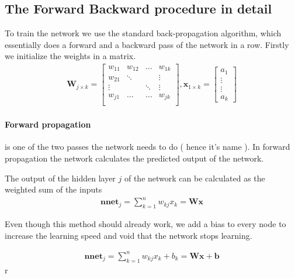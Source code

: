 \documentclass{acm_proc_article-sp}
\begin{document}
\subsection{The Forward Backward procedure in detail}

To train the network we use the standard back-propagation algorithm, which essentially does a forward and a backward pass of the network in a row.
Firstly we initialize the weights in a matrix.
\begin{align}
\mathbf{W}_{j \times k } = \begin{bmatrix}
w_{11} & w_{12} & \ldots & w_{1k}\\
w_{21} & \ddots & & \vdots\\
\vdots & & \ddots  & \vdots\\
w_{j1} & \ldots & \ldots  & w_{jk}\\
\end{bmatrix},
\mathbf{x}_{1 \times k} = \begin{bmatrix}
a_{1} \\
\vdots\\
\vdots \\
a_{k}
\end{bmatrix}
\end{align}


\paragraph{Forward propagation} is one of the two passes the network needs to do ( hence it's name ).
In forward propagation the network calculates the predicted output of the network.

The output of the hidden layer $j$ of the network can be calculated as the weighted sum of the inputs
\begin{align}
\mathbf{nnet}_j = \sum_{k=1}^{n}w_{kj}x_k = \mathbf{W} \mathbf{x}
\end{align}

Even though this method should already work, we add a bias to every node to increase the learning speed and void that the network stops learning.

\begin{align}
\mathbf{nnet}_j = \sum_{k=1}^{n}w_{kj}x_k + b_k = \mathbf{W} \mathbf{x} + \mathbf{b}
\end{align}r
\end{document}
